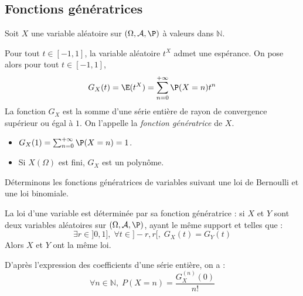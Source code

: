 \documentclass[french,11pt,twoside]{VcCours}
\begin{document}
\subsection{Fonctions génératrices}
\begin{TheoremeDefinition}{} Soit $X$ une variable aléatoire sur $(\Omega, \mathcal{A}, \P)$ à valeurs dans $\mathbb{N}$.

Pour tout $t \in [-1,1]$, la variable aléatoire $t^X$ admet une espérance. On pose alors pour tout $t \in [-1,1]$,
$$ G_X(t)= \E(t^X) = \sum_{n=0}^{+ \infty} \P(X=n) t^n$$
La fonction $G_X$ est la somme d'une série entière de rayon de convergence supérieur ou égal à $1$. On l'appelle la \emph{fonction génératrice} de $X$.
\end{TheoremeDefinition}{}

\begin{Demonstration}{}
\vspace{5cm}
\end{Demonstration}

\begin{Remarques}{}
\begin{itemize}
\item $G_X(1)= \sum_{n=0}^{+ \infty} \P(X=n)=1$.
\item Si $X(\Omega)$ est fini, $G_X$ est un polynôme.
\end{itemize}
\end{Remarques}

\begin{Exemple}{} Déterminons les fonctions génératrices de variables suivant une loi de Bernoulli et une loi binomiale.

\vspace{5cm}
\end{Exemple}

\begin{Proposition}{} La loi d'une variable est déterminée par sa fonction génératrice : si $X$ et $Y$ sont deux variables aléatoires sur $(\Omega, \mathcal{A}, \P)$, ayant le même support et telles que :
$$ \exists r \in ]0,1], \; \forall t \in ]-r,r[, \; G_X(t)=G_Y(t)$$
Alors $X$ et $Y$ ont la même loi.
\end{Proposition}

\begin{Demonstration}{}

\vspace{3cm}
\end{Demonstration}

\begin{Remarque}{} D'après l'expression des coefficients d'une série entière, on a :
$$ \forall n \in \mathbb{N}, \; P(X=n) = \dfrac{G_X^{(n)}(0)}{n!}$$
\end{Remarque}
\end{document}
